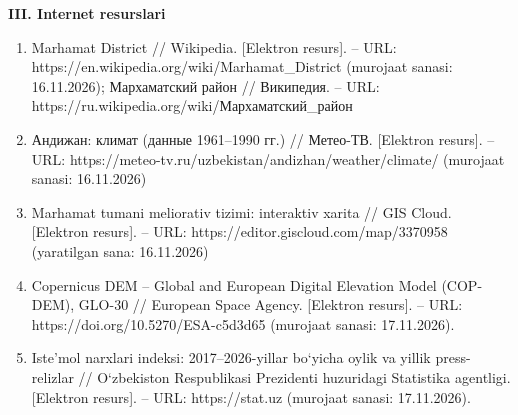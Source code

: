 \textbf{III. Internet resurslari}

\begin{enumerate}
\def\labelenumi{\arabic{enumi}.}
\setcounter{enumi}{134}
\item
  Marhamat District // Wikipedia. {[}Elektron resurs{]}. -- URL:
  https://en.wikipedia.org/wiki/Marhamat\_District (murojaat sanasi:
  16.11.2026); Мархаматский район // Википедия. -- URL:
  https://ru.wikipedia.org/wiki/Мархаматский\_район
\item
  Андижан: климат (данные 1961--1990 гг.) // Метео-ТВ. {[}Elektron
  resurs{]}. -- URL:
  https://meteo-tv.ru/uzbekistan/andizhan/weather/climate/ (murojaat
  sanasi: 16.11.2026)
\item
  Marhamat tumani meliorativ tizimi: interaktiv xarita // GIS Cloud.
  {[}Elektron resurs{]}. -- URL: https://editor.giscloud.com/map/3370958
  (yaratilgan sana: 16.11.2026)
\item
  Copernicus DEM -- Global and European Digital Elevation Model
  (COP-DEM), GLO-30 // European Space Agency. {[}Elektron resurs{]}. --
  URL: https://doi.org/10.5270/ESA-c5d3d65 (murojaat sanasi:
  17.11.2026).
\item
  Iste'mol narxlari indeksi: 2017--2026-yillar bo`yicha oylik va yillik
  press-relizlar // O`zbekiston Respublikasi Prezidenti huzuridagi
  Statistika agentligi. {[}Elektron resurs{]}. -- URL: https://stat.uz
  (murojaat sanasi: 17.11.2026).
\end{enumerate}




